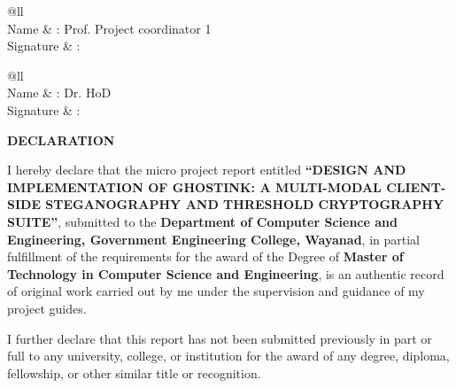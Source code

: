 \documentclass[12pt,a4paper,oneside,openany]{report}
\begin{document}
\vspace{1.4cm}

\noindent
\begin{minipage}[t]{0.48\textwidth}
    \begin{tabular}{@{}ll}
        \\[0.25cm]
        Name & : Prof. Project coordinator 1\\[0.25cm]
        Signature & : \makebox[3.2cm]{\dotfill}
    \end{tabular}
\end{minipage}
\hfill
\begin{minipage}[t]{0.48\textwidth}
    \begin{tabular}{@{}ll}
        \\[0.25cm]
        Name & : Dr. HoD\\[0.25cm]
        Signature & : \makebox[3.2cm]{\dotfill}
    \end{tabular}
\end{minipage}

\vfill

\clearpage
\thispagestyle{plain}
\begin{center}
    \textbf{\Large DECLARATION}\\[1.0cm]
\end{center}

\hspace*{0.5in}I hereby declare that the micro project report entitled \textbf{``DESIGN AND IMPLEMENTATION OF GHOSTINK: A MULTI-MODAL CLIENT-SIDE STEGANOGRAPHY AND THRESHOLD CRYPTOGRAPHY SUITE''}, submitted to the \textbf{Department of Computer Science and Engineering, Government Engineering College, Wayanad}, in partial fulfillment of the requirements for the award of the Degree of \textbf{Master of Technology in Computer Science and Engineering}, is an authentic record of original work carried out by me under the supervision and guidance of my project guides.

\vspace{0.4cm}
\hspace*{0.5in}I further declare that this report has not been submitted previously in part or full to any university, college, or institution for the award of any degree, diploma, fellowship, or other similar title or recognition.\\[1.5cm]
\end{document}
